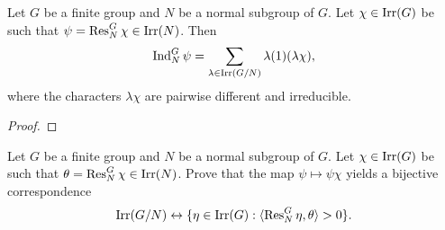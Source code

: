 \begin{theorem}[Gallagher]
\label{thm:Gallagher}
    Let $G$ be a finite group and $N$ be a normal subgroup of $G$. 
    Let $\chi\in\operatorname{Irr}(G)$ be such that $\psi=\operatorname{Res}_N^G\chi\in\operatorname{Irr}(N)$. Then
    \[
    \operatorname{Ind}_N^G\psi=\sum_{\lambda\in\operatorname{Irr}(G/N)}\lambda(1)(\lambda\chi),
    \]
    where the characters $\lambda\chi$ are pairwise different and irreducible. 
\end{theorem}

\begin{proof}
    
\end{proof}

\begin{exercise}
    Let $G$ be a finite group and $N$ be a normal subgroup of $G$. Let $\chi\in\operatorname{Irr}(G)$ 
    be such that $\theta=\operatorname{Res}_N^G\chi\in\operatorname{Irr}(N)$. Prove that the map 
    $\psi\mapsto\psi\chi$ yields 
    a bijective 
    correspondence 
    \[
    \operatorname{Irr}(G/N)\leftrightarrow\{\eta\in\operatorname{Irr}(G):\langle\operatorname{Res}_N^G\eta,\theta\rangle>0\}.
    \]
\end{exercise}
